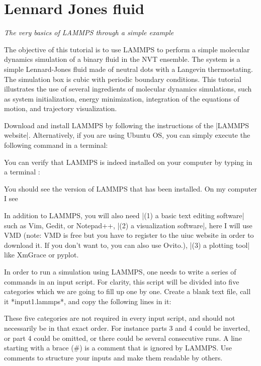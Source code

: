 \chapter{Lennard Jones fluid}
\label{lennard-jones-label}

\vspace{-1cm} \noindent \textcolor{graytitle}{\textit{{\Large The very basics of LAMMPS through a simple example}}\vspace{0.5cm} }

The objective of this tutorial is to use
LAMMPS to perform a simple molecular dynamics simulation
of a binary fluid in the NVT ensemble. The system is a simple Lennard-Jones fluid
made of neutral dots with a Langevin thermostating. The
simulation box is cubic with periodic boundary conditions.
This tutorial illustrates the use of several ingredients of
molecular dynamics simulations, such as system initialization,
energy minimization, integration of the equations of motion,
and trajectory visualization.

Download and install LAMMPS by following the instructions of the |LAMMPS website|.
Alternatively, if you are using Ubuntu OS, you can simply execute the
following command in a terminal:

You can verify that LAMMPS is indeed installed on your
computer by typing in a terminal :

You should see the version of LAMMPS that has been
installed. On my computer I see

In addition to LAMMPS, you will also need |(1) a basic text editing software|
such as Vim, Gedit, or Notepad++, |(2) a visualization software|, here I
will use VMD (note: VMD is free but you have to register to
the uiuc website in order to download it. If you don't want
to, you can also use Ovito.), |(3) a plotting tool| like
XmGrace or pyplot.

In order to run a simulation using LAMMPS, one needs to
write a series of commands in an input script. For clarity,
this script will be divided into five categories which we are going to
fill up one by one. Create a blank text file, call it
*input1.lammps*, and copy the following lines in it:

These five categories are not required in every
input script, and should not necessarily be in that
exact order. For instance parts 3 and 4 could be inverted, or
part 4 could be omitted, or there could be several
consecutive runs.
A line starting with a brace (#) is a comment
that is ignored by LAMMPS. Use comments to structure 
your inputs and make them readable by others.

